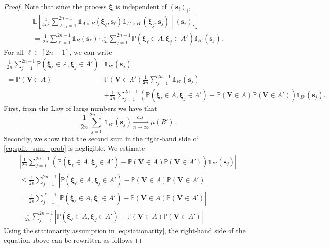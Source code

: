\documentclass[11pt,a4paper,oneside]{article}
\theoremstyle{definition}
\theoremstyle{remark}
\def\E{\mathbb{E}}
\def\P{\mathbb{P}}
\begin{document}
\begin{proof}
Note that since the process $\bm \xi$ is independent of $(\bm s_i)_i$,
\begin{multline}\label{eq:rewriting_the_expression}
\E\left[\frac{1}{4n^2}\sum_{\ell,j=1}^{2n-1} \mathds{1}_{A \times B}\left(\bm \xi_\ell,\bm s_\ell\right) \mathds{1}_{A' \times B'}\left(\bm \xi_j,\bm s_j\right)\middle| (\bm s_i)_i\right]\\
=\frac{1}{2n}\sum_{\ell=1}^{2n-1}\mathds{1}_{B}(\bm s_\ell) \cdot \frac{1}{2n}\sum_{j=1}^{2n-1} \P\left(\bm \xi_\ell\in A,\bm \xi_j\in A'\right)\mathds{1}_{B'}(\bm s_j).
\end{multline} 
For all $\ell\in[2n-1]$, we can write
\begin{align}\label{eq:split_sum_prob}
\frac{1}{2n}\sum_{j=1}^{2n-1} \P\left(\bm \xi_\ell\in A,\bm \xi_j\in A'\right)&\mathds{1}_{B'}(\bm s_j)\\
=\P\left(\bm V \in A\right)&\P\left(\bm V \in A'\right)\frac{1}{2n}\sum_{j=1}^{2n-1} \mathds{1}_{B'}(\bm s_j)\\
&+\frac{1}{2n}\sum_{j=1}^{2n-1} \left(\P\left(\bm \xi_\ell\in A,\bm \xi_j\in A'\right)-\P\left(\bm V \in A\right)\P\left(\bm V \in A'\right)\right)\mathds{1}_{B'}(\bm s_j).
\end{align}
First, from the Law of large numbers we have that
\begin{equation}\label{eq:first_lim_real}
\frac{1}{2n}\sum_{j=1}^{2n-1}\mathds{1}_{B'}(\bm s_j)\xrightarrow[n\to\infty]{a.s.}\mu(B').
\end{equation}
Secondly, we show that the second sum in the right-hand side of \cref{eq:split_sum_prob} is negligible. We estimate
\begin{multline}
\left|\frac{1}{2n}\sum_{j=1}^{2n-1} \left(\P\left(\bm \xi_\ell\in A,\bm \xi_j\in A'\right)-\P\left(\bm V \in A\right)\P\left(\bm V \in A'\right)\right)\mathds{1}_{B'}(\bm s_j)\right|\\
\leq
\frac{1}{2n}\sum_{j=1}^{2n-1} \left|\P\left(\bm \xi_\ell\in A,\bm \xi_j\in A'\right)-\P\left(\bm V\in A\right)\P\left(\bm V \in A'\right)\right|\\
=
\frac{1}{2n}\sum_{j=1}^{\ell-1} \left|\P\left(\bm \xi_\ell\in A,\bm \xi_j\in A'\right)-\P\left(\bm V\in A\right)\P\left(\bm V \in A'\right)\right|\\
+\frac{1}{2n}\sum_{j=\ell}^{2n-1} \left|\P\left(\bm \xi_\ell\in A,\bm \xi_j\in A'\right)-\P\left(\bm V\in A\right)\P\left(\bm V \in A'\right)\right|
\end{multline}
Using the stationarity assumption in \cref{eq:stationarity}, the right-hand side of the equation above can be rewritten as follows

\end{proof}
\end{document}
